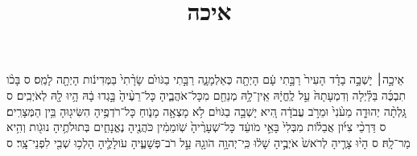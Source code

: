 \documentclass{openreader}
\title{איכה}
\date{}
\begin{document}
\maketitle
\raggedbottom 
\fontsize{16pt}{24pt}\selectfont


אֵיכָ֣ה׀ יָשְׁבָ֣ה בָדָ֗ד הָעִיר֙ רַבָּ֣תִי עָ֔ם הָיְתָ֖ה כְּאַלְמָנָ֑ה רַבָּ֣תִי בַגֹּויִ֗ם שָׂרָ֨תִי֙ בַּמְּדִינֹ֔ות הָיְתָ֖ה לָמַֽס׃ ס 
בָּכֹ֨ו תִבְכֶּ֜ה בַּלַּ֗יְלָה וְדִמְעָתָהּ֙ עַ֣ל לֶֽחֱיָ֔הּ אֵֽין־לָ֥הּ מְנַחֵ֖ם מִכָּל־אֹהֲבֶ֑יהָ כָּל־רֵעֶ֨יהָ֙ בָּ֣גְדוּ בָ֔הּ הָ֥יוּ לָ֖הּ לְאֹיְבִֽים׃ ס 
גָּֽלְתָ֨ה יְהוּדָ֤ה מֵעֹ֨נִי֙ וּמֵרֹ֣ב עֲבֹדָ֔ה הִ֚יא יָשְׁבָ֣ה בַגֹּויִ֔ם לֹ֥א מָצְאָ֖ה מָנֹ֑וחַ כָּל־רֹדְפֶ֥יהָ הִשִּׂיג֖וּהָ בֵּ֥ין הַמְּצָרִֽים׃ ס 
דַּרְכֵ֨י צִיֹּ֜ון אֲבֵלֹ֗ות מִבְּלִי֙ בָּאֵ֣י מֹועֵ֔ד כָּל־שְׁעָרֶ֨יהָ֙ שֹֽׁומֵמִ֔ין כֹּהֲנֶ֖יהָ נֶאֱנָחִ֑ים בְּתוּלֹתֶ֥יהָ נוּגֹ֖ות וְהִ֥יא מַר־לָֽהּ׃ ס 
הָי֨וּ צָרֶ֤יהָ לְרֹאשׁ֙ אֹיְבֶ֣יהָ שָׁל֔וּ כִּֽי־יְהוָ֥ה הֹוגָ֖הּ עַ֣ל רֹב־פְּשָׁעֶ֑יהָ עֹולָלֶ֛יהָ הָלְכ֥וּ שְׁבִ֖י לִפְנֵי־צָֽר׃ ס 
\end{document}
